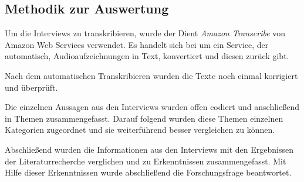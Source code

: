 \subsection{Methodik zur Auswertung}

Um die Interviews zu transkribieren, wurde der Dient \textit{Amazon Transcribe} von Amazon Web Services verwendet. Es handelt sich bei um ein Service, der automatisch, Audioaufzeichnungen in Text, konvertiert und diesen zurück gibt.

Nach dem automatischen Transkribieren wurden die Texte noch einmal korrigiert und überprüft.

Die einzelnen Aussagen aus den Interviews wurden offen codiert und anschließend in Themen zusammengefasst. Darauf folgend wurden diese Themen einzelnen Kategorien zugeordnet und sie weiterführend besser vergleichen zu können.

Abschließend wurden die Informationen aus den Interviews mit den Ergebnissen der Literaturrecherche verglichen und zu Erkenntnissen zusammengefasst. Mit Hilfe dieser Erkenntnissen wurde abschließend die Forschungsfrage beantwortet.

